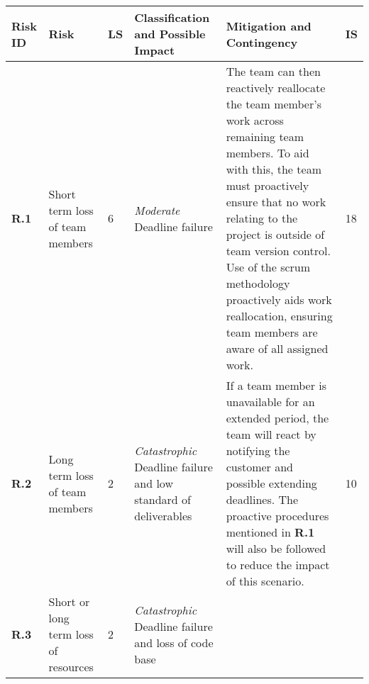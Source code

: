\begin{longtable}[H]{| p{0.6cm} | p{2cm} | p{0.3cm} | p{2.6cm} | p{8.1cm} | p{0.7cm} |}
    \hline
    \cellcolor{titleColor}\textbf{Risk ID}   & \cellcolor{titleColor}\textbf{Risk}                                             &\cellcolor{titleColor}\textbf{LS}        & \cellcolor{titleColor}\textbf{Classification and Possible Impact}                                 & \cellcolor{titleColor}\textbf{Mitigation and Contingency} & \cellcolor{titleColor}\textbf{IS} \\ \hline                                                                                                                                                                                                                                                                                                                                                                                                                                                                                                                                
    \textbf{R.1}   & Short term loss of team members                  & 6       & \textit{Moderate}
\newline Deadline failure                                        
      &  The team can then reactively reallocate the team member's work across remaining team members. To aid with this, the team must proactively ensure that no work relating to the project is outside of team version control. Use of the scrum methodology proactively aids work reallocation, ensuring team members are aware of all assigned work. 
      & 18    \\ \hline
    \textbf{R.2}    & Long term loss of team members                   & 2 & \textit{Catastrophic}
\newline Deadline failure and low standard of deliverables 
    & If a team member is unavailable for an extended period, the team will react by notifying the customer and possible extending deadlines. The proactive procedures mentioned in \textbf{R.1} will also be followed to reduce the impact of this scenario.                                                                                                                                                                                                                                                                                            
    & 10    \\ \hline
    \textbf{R.3}     & Short or long term loss of resources             & 2 & \textit{Catastrophic}
\newline Deadline failure and loss of code base              

\end{longtable}
